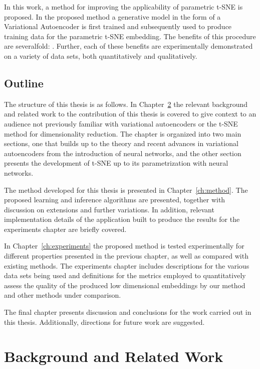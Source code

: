 In this work, a method for improving the applicability of parametric t-SNE is proposed. In the proposed method a generative model in the form of a Variational Autoencoder is first trained and subsequently used to produce training data for the parametric t-SNE embedding. The benefits of this procedure are severalfold: . Further, each of these benefits are experimentally demonstrated on a variety of data sets, both quantitatively and qualitatively.

\section{Outline}

The structure of this thesis is as follows. In Chapter~\ref{ch:background_and_related_work} the relevant background and related work to the contribution of this thesis is covered to give context to an audience not previously familiar with variational autoencoders or the t-SNE method for dimensionality reduction. The chapter is organized into two main sections, one that builds up to the theory and recent advances in variational autoencoders from the introduction of neural networks, and the other section presents the development of t-SNE up to its parametrization with neural networks.

The method developed for this thesis is presented in Chapter~\ref{ch:method}. The proposed learning and inference algorithms are presented, together with discussion on extensions and further variations. In addition, relevant implementation details of the application built to produce the results for the experiments chapter are briefly covered.

In Chapter~\ref{ch:experiments} the proposed method is tested experimentally for different properties presented in the previous chapter, as well as compared with existing methods. The experiments chapter includes descriptions for the various data sets being used and definitions for the metrics employed to quantitatively assess the quality of the produced low dimensional embeddings by our method and other methods under comparison.

The final chapter presents discussion and conclusions for the work carried out in this thesis. Additionally, directions for future work are suggested.

\chapter{Background and Related Work}
\label{ch:background_and_related_work}


